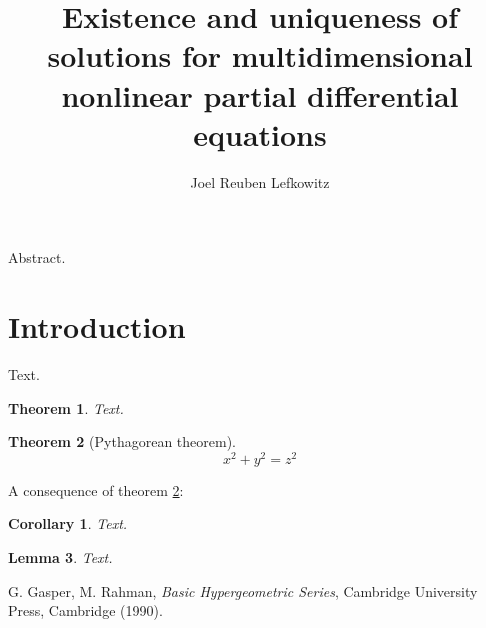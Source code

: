 \documentclass[12pt]{article}
\newtheorem{theorem}{Theorem}[section]
\newtheorem{corollary}{Corollary}[theorem]
\newtheorem{lemma}[theorem]{Lemma}
\renewenvironment{abstract}
 {\small
  \begin{center}
  \bfseries \abstractname\vspace{-.5em}\vspace{0pt}
  \end{center}
  \list{}{
    \setlength{\leftmargin}{.5cm}%
    \setlength{\rightmargin}{\leftmargin}%
  }%
  \item\relax}
 {\endlist}
\begin{document}
\title{Existence and uniqueness of solutions for multidimensional nonlinear partial differential equations}
\author{Joel Reuben Lefkowitz \\
  }
\maketitle

\begin{abstract}
  Abstract.
\end{abstract}
\section{Introduction}
Text.

\begin{theorem}
  Text.
\end{theorem}

\begin{theorem}[Pythagorean theorem]
  \label{pythagorean}
  \[ x^2 + y^2 = z^2 \]
\end{theorem}

A consequence of theorem \ref{pythagorean}:

\begin{corollary}
  Text.
\end{corollary}

\begin{lemma}
  Text.
\end{lemma}

\begin{thebibliography}{99}

   G. Gasper, M. Rahman, {\it Basic Hypergeometric Series}, Cambridge University Press, Cambridge (1990).

\end{thebibliography}
\end{document}

